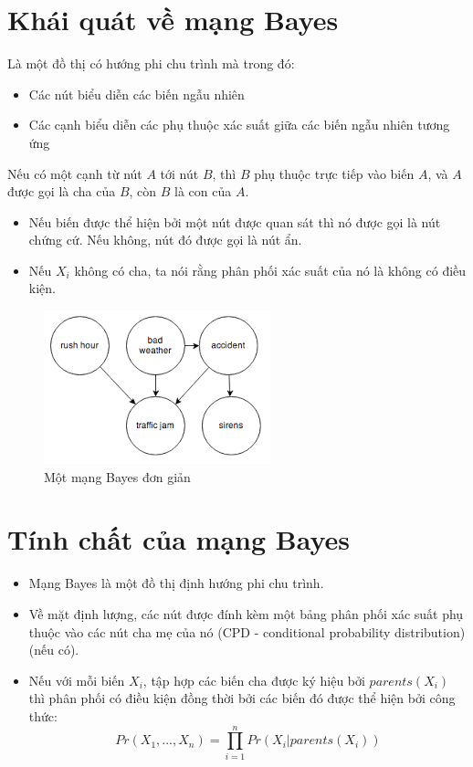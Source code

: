 \documentclass[12pt]{report}
\begin{document}


\newpage
\setcounter{page}{1}

\tableofcontents 
\newpage

\section{Khái quát về mạng Bayes}
Là một đồ thị có hướng phi chu trình mà trong đó:
\begin{itemize}
\item Các nút biểu diễn các biến ngẫu nhiên
\item Các cạnh biểu diễn các phụ thuộc xác suất giữa các biến ngẫu nhiên tương ứng
\end{itemize}
Nếu có một cạnh từ nút $A$ tới nút $B$, thì $B$ phụ thuộc trực tiếp vào biến $A$, và $A$ được 
gọi là cha của $B$, còn $B$ là con của $A$.
\begin{itemize}
\item Nếu biến được thể hiện bởi một nút được quan sát thì nó được gọi là nút chứng cứ.
Nếu không, nút đó được gọi là nút ẩn.
\item Nếu $X_i$ không có cha, ta nói rằng phân phối xác suất của nó là không có điều kiện. 
\end{itemize}
\begin{figure}[h]
\centering
\includegraphics[scale=1]{mang-bayesian.png}
\caption{Một mạng Bayes đơn giản}
\end{figure}

\section{Tính chất của mạng Bayes}
\begin{itemize}
\item Mạng Bayes là một đồ thị định hướng phi chu trình.
\item Về mặt định lượng, các nút được đính kèm một bảng phân phối xác suất phụ 
thuộc vào các nút cha mẹ của nó (CPD - conditional probability distribution) (nếu có).
\item Nếu với mỗi biến $X_i$, tập hợp các biến cha được ký hiệu bởi $parents(X_i)$ thì phân
phối có điều kiện đồng thời bởi các biến  đó được thể hiện bởi công thức: 
$$Pr(X_1, ..., X_n) = \prod_{i=1}^n Pr(X_i | parents(X_i))$$
\end{itemize}
\end{document}
